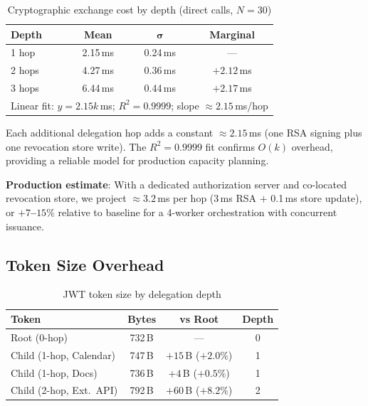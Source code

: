 \documentclass[journal]{IEEEtran}
\begin{document}
\begin{table}[h]
\caption{Cryptographic exchange cost by depth (direct calls, $N=30$)}
\label{tab:hopcosts}
\centering
\footnotesize
\begin{tabular}{lccc}
\toprule
\textbf{Depth} & \textbf{Mean} & $\boldsymbol\sigma$ & \textbf{Marginal} \\
\midrule
1 hop  & 2.15\,ms & 0.24\,ms & --- \\
2 hops & 4.27\,ms & 0.36\,ms & $+2.12$\,ms \\
3 hops & 6.44\,ms & 0.44\,ms & $+2.17$\,ms \\
\midrule
\multicolumn{4}{l}{\scriptsize
  Linear fit: $y = 2.15k$\,ms;\; $R^2 = 0.9999$;\; slope $\approx 2.15$\,ms/hop}
\end{tabular}
\end{table}

Each additional delegation hop adds a constant $\approx 2.15$\,ms (one RSA
signing plus one revocation store write). The $R^2 = 0.9999$ fit confirms
$O(k)$ overhead, providing a reliable model for production capacity planning.

\textbf{Production estimate}: With a dedicated authorization server and
co-located revocation store, we project $\approx 3.2$\,ms per hop (3\,ms RSA
$+$ 0.1\,ms store update), or \textbf{$+7$--$15\%$} relative to baseline for
a 4-worker orchestration with concurrent issuance.

\subsection{Token Size Overhead}

\begin{table}[h]
\caption{JWT token size by delegation depth}
\label{tab:tokensizes}
\centering
\footnotesize
\begin{tabular}{lccc}
\toprule
\textbf{Token} & \textbf{Bytes} & \textbf{vs Root} & \textbf{Depth} \\
\midrule
Root (0-hop)             & 732\,B & ---                    & 0 \\
Child (1-hop, Calendar)  & 747\,B & $+15$\,B ($+2.0\%$)   & 1 \\
Child (1-hop, Docs)      & 736\,B & $+4$\,B ($+0.5\%$)    & 1 \\
Child (2-hop, Ext.\ API) & 792\,B & $+60$\,B ($+8.2\%$)   & 2 \\
\bottomrule
\end{tabular}
\end{table}
\end{document}
